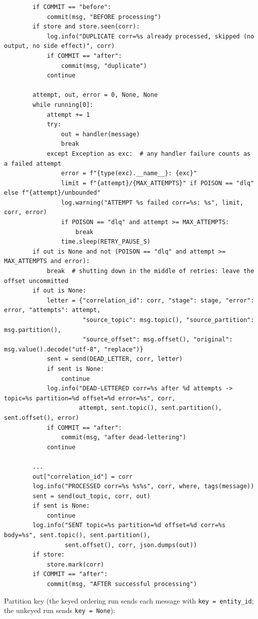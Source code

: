 \documentclass[11pt]{article}
\begin{document}
\begingroup\lstset{basicstyle=\ttfamily\tiny}
\begin{lstlisting}
        if COMMIT == "before":
            commit(msg, "BEFORE processing")
        if store and store.seen(corr):
            log.info("DUPLICATE corr=%s already processed, skipped (no output, no side effect)", corr)
            if COMMIT == "after":
                commit(msg, "duplicate")
            continue

        attempt, out, error = 0, None, None
        while running[0]:
            attempt += 1
            try:
                out = handler(message)
                break
            except Exception as exc:  # any handler failure counts as a failed attempt
                error = f"{type(exc).__name__}: {exc}"
                limit = f"{attempt}/{MAX_ATTEMPTS}" if POISON == "dlq" else f"{attempt}/unbounded"
                log.warning("ATTEMPT %s failed corr=%s: %s", limit, corr, error)
                if POISON == "dlq" and attempt >= MAX_ATTEMPTS:
                    break
                time.sleep(RETRY_PAUSE_S)
        if out is None and not (POISON == "dlq" and attempt >= MAX_ATTEMPTS and error):
            break  # shutting down in the middle of retries: leave the offset uncommitted
        if out is None:
            letter = {"correlation_id": corr, "stage": stage, "error": error, "attempts": attempt,
                      "source_topic": msg.topic(), "source_partition": msg.partition(),
                      "source_offset": msg.offset(), "original": msg.value().decode("utf-8", "replace")}
            sent = send(DEAD_LETTER, corr, letter)
            if sent is None:
                continue
            log.info("DEAD-LETTERED corr=%s after %d attempts -> topic=%s partition=%d offset=%d error=%s", corr,
                     attempt, sent.topic(), sent.partition(), sent.offset(), error)
            if COMMIT == "after":
                commit(msg, "after dead-lettering")
            continue

        ...
        out["correlation_id"] = corr
        log.info("PROCESSED corr=%s %s%s", corr, where, tags(message))
        sent = send(out_topic, corr, out)
        if sent is None:
            continue
        log.info("SENT topic=%s partition=%d offset=%d corr=%s body=%s", sent.topic(), sent.partition(),
                 sent.offset(), corr, json.dumps(out))
        if store:
            store.mark(corr)
        if COMMIT == "after":
            commit(msg, "AFTER successful processing")
\end{lstlisting}
\endgroup
Partition key (the keyed ordering run sends each message with \texttt{key = entity\_\allowbreak{}id}; the unkeyed run sends \texttt{key = None}):
\end{document}

